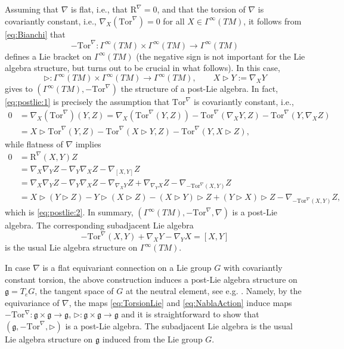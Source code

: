 \documentclass[10pt]{article}
\theoremstyle{definition}
\begin{document}
Assuming that $\nabla$ is flat, i.e., that $\mathrm{R}^\nabla=0$, and that the torsion of $\nabla$ is covariantly constant, i.e., $\nabla_X(\mathrm{Tor}^\nabla)=0$ for all $X\in\Gamma^\infty(TM)$, it follows from \eqref{eq:Bianchi} that
\begin{equation}\label{eq:TorsionLie}
    -\mathrm{Tor}^\nabla\colon\Gamma^\infty(TM)\times\Gamma^\infty(TM)\to\Gamma^\infty(TM)
\end{equation} 
defines a Lie bracket on $\Gamma^\infty(TM)$ (the negative sign is not important for the Lie algebra structure, but turns out to be crucial in what follows). In this case,
\begin{equation}\label{eq:NablaAction}
    \rhd\colon\Gamma^\infty(TM)\times\Gamma^\infty(TM)\to\Gamma^\infty(TM),
    \qquad X\rhd Y:=\nabla_XY
\end{equation}
gives to $(\Gamma^\infty(TM),-\mathrm{Tor}^\nabla)$ the structure of a post-Lie algebra. In fact, \eqref{eq:postlie:1} is precisely the assumption that $\mathrm{Tor}^\nabla$ is covariantly constant, i.e.,
\begin{align*}
    0
    &=\nabla_X(\mathrm{Tor}^\nabla)(Y,Z)
    =\nabla_X(\mathrm{Tor}^\nabla(Y,Z))-\mathrm{Tor}^\nabla(\nabla_XY,Z)-\mathrm{Tor}^\nabla(Y,\nabla_XZ)\\
    &=X\rhd\mathrm{Tor}^\nabla(Y,Z)-\mathrm{Tor}^\nabla(X\rhd Y,Z)-\mathrm{Tor}^\nabla(Y,X\rhd Z),
\end{align*}
while flatness of $\nabla$ implies
\begin{align*}
    0
    &=\mathrm{R}^\nabla(X,Y)Z\\
    &=\nabla_X\nabla_YZ-\nabla_Y\nabla_XZ-\nabla_{[X,Y]}Z\\
    &=\nabla_X\nabla_YZ-\nabla_Y\nabla_XZ-\nabla_{\nabla_XY}Z+\nabla_{\nabla_YX}Z-\nabla_{-\mathrm{Tor}^\nabla(X,Y)}Z\\
    &=X\rhd(Y\rhd Z)-Y\rhd(X\rhd Z)
    -(X\rhd Y)\rhd Z+(Y\rhd X)\rhd Z
    -\nabla_{-\mathrm{Tor}^\nabla(X,Y)}Z,
\end{align*}
which is \eqref{eq:postlie:2}. In summary, $(\Gamma^\infty(TM),-\mathrm{Tor}^\nabla,\nabla)$ is a post-Lie algebra. The corresponding subadjacent Lie algebra
$$
-\mathrm{Tor}^\nabla(X,Y)+\nabla_XY-\nabla_YX=[X,Y]
$$
is the usual Lie algebra structure on $\Gamma^\infty(TM)$.

In case $\nabla$ is a flat equivariant connection on a Lie group $G$ with covariantly constant torsion, the above construction induces a post-Lie algebra structure on $\mathfrak{g}=T_eG$, the tangent space of $G$ at the neutral element, see e.g. \cite[Sec. 2.1]{LBG}. Namely, by the equivariance of $\nabla$, the maps \eqref{eq:TorsionLie} and \eqref{eq:NablaAction} induce maps $-\mathrm{Tor^\nabla\colon}\mathfrak{g}\times\mathfrak{g}\to\mathfrak{g}$, $\rhd\colon\mathfrak{g}\times\mathfrak{g}\to\mathfrak{g}$ and it is straightforward to show that $(\mathfrak{g},-\mathrm{Tor}^\nabla,\rhd)$ is a post-Lie algebra. The subadjacent Lie algebra is the usual Lie algebra structure on $\mathfrak{g}$ induced from the Lie group $G$. 
\end{document}

